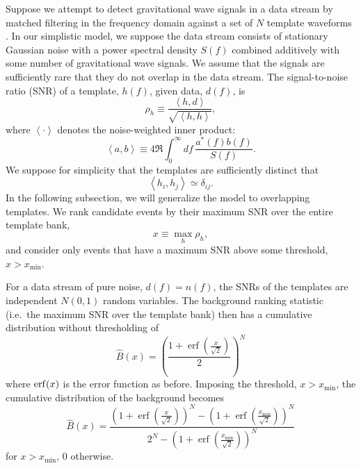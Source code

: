 \documentclass[aps,prd,reprint,nofootinbib]{revtex4-1}
\newcommand{\xmin}{x_\mathrm{min}}
\DeclareMathOperator{\erf}{erf}
\begin{document}
Suppose we attempt to detect gravitational wave signals in a data
stream by matched filtering in the frequency domain against a set of
$N$ template waveforms \citep[e.g.,][]{findchirppaper,LVC2011}.  In
our simplistic model, we suppose the data stream consists of
stationary Gaussian noise with a power spectral density $S(f)$
combined additively with some number of gravitational wave signals.
We assume that the signals are sufficiently rare that they do not
overlap in the data stream.  The signal-to-noise ratio (SNR) of a
template, $h(f)$, given data, $d(f)$, is
\begin{equation}
  \rho_h \equiv \frac{\left\langle h, d \right\rangle}{\sqrt{\left
      \langle h, h \right\rangle}},
\end{equation}
where $\left \langle \cdot \right\rangle$ denotes the noise-weighted
inner product:
\begin{equation}
  \left\langle a, b \right\rangle \equiv 4 \Re \int_0^\infty df\,
  \frac{a^*(f) b(f)}{S(f)}.
\end{equation}
We suppose for simplicity that the templates are sufficiently distinct
that
\begin{equation}
  \left\langle h_i, h_j \right\rangle \simeq \delta_{ij}.
\end{equation}
In the following subsection, we will generalize the model to
overlapping templates.  We rank candidate events by their maximum SNR
over the entire template bank,
\begin{equation}
  x \equiv \max_{h} \rho_h,
\end{equation}
and consider only events that have a maximum SNR above some threshold,
$x > \xmin$.

For a data stream of pure noise, $d(f) = n(f)$, the SNRs of the
templates are independent $N(0,1)$ random variables.  The background
ranking statistic (i.e.\ the maximum SNR over the template bank) then
has a cumulative distribution without thresholding of
\begin{equation}
  \hat{B}(x) = \left( \frac{1 + \erf\left( \frac{x}{\sqrt{2}}
    \right)}{2} \right)^N
\end{equation}
where ${\rm erf}(x)$ is the error function as before. Imposing the
threshold, $x > \xmin$, the cumulative distribution of the background
becomes
\begin{equation}
  \label{eq:analytic-background-rate}
  \hat{B}(x) = \frac{\left( 1 + \erf\left( \frac{x}{{\sqrt{2}}}
    \right) \right)^N - \left( 1 + \erf\left( \frac{\xmin}{{\sqrt{2}}}
    \right) \right)^N}{2^N - \left( 1 + \erf\left(
    \frac{\xmin}{{\sqrt{2}}} \right) \right)^N }
\end{equation}
for $x>\xmin$, $0$ otherwise.
\end{document}
